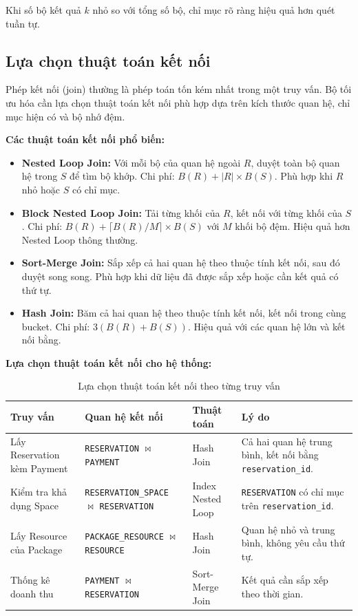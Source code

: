 Khi số bộ kết quả $k$ nhỏ so với tổng số bộ, chỉ mục rõ ràng hiệu quả hơn quét tuần tự.

\subsection{Lựa chọn thuật toán kết nối}

Phép kết nối (join) thường là phép toán tốn kém nhất trong một truy vấn. Bộ tối ưu hóa cần lựa chọn thuật toán kết nối phù hợp dựa trên kích thước quan hệ, chỉ mục hiện có và bộ nhớ đệm.

\textbf{Các thuật toán kết nối phổ biến:}

\begin{itemize}
    \item \textbf{Nested Loop Join:} Với mỗi bộ của quan hệ ngoài $R$, duyệt toàn bộ quan hệ trong $S$ để tìm bộ khớp. Chi phí: $B(R) + |R| \times B(S)$. Phù hợp khi $R$ nhỏ hoặc $S$ có chỉ mục.
    \item \textbf{Block Nested Loop Join:} Tải từng khối của $R$, kết nối với từng khối của $S$. Chi phí: $B(R) + \lceil B(R)/M \rceil \times B(S)$ với $M$ khối bộ đệm. Hiệu quả hơn Nested Loop thông thường.
    \item \textbf{Sort-Merge Join:} Sắp xếp cả hai quan hệ theo thuộc tính kết nối, sau đó duyệt song song. Phù hợp khi dữ liệu đã được sắp xếp hoặc cần kết quả có thứ tự.
    \item \textbf{Hash Join:} Băm cả hai quan hệ theo thuộc tính kết nối, kết nối trong cùng bucket. Chi phí: $3(B(R) + B(S))$. Hiệu quả với các quan hệ lớn và kết nối bằng.
\end{itemize}

\textbf{Lựa chọn thuật toán kết nối cho hệ thống:}

\begin{table}[htbp]
\centering
\begin{tabularx}{\linewidth}{|p{3.0cm}|p{4.2cm}|p{2.8cm}|X|}
\hline
\textbf{Truy vấn} & \textbf{Quan hệ kết nối} & \textbf{Thuật toán} & \textbf{Lý do} \\
\hline
Lấy Reservation kèm Payment & \texttt{RESERVATION} $\bowtie$ \texttt{PAYMENT} & Hash Join & Cả hai quan hệ trung bình, kết nối bằng \texttt{reservation\_id}. \\
\hline
Kiểm tra khả dụng Space & \texttt{RESERVATION\_SPACE} $\bowtie$ \texttt{RESERVATION} & Index Nested Loop & \texttt{RESERVATION} có chỉ mục trên \texttt{reservation\_id}. \\
\hline
Lấy Resource của Package & \texttt{PACKAGE\_RESOURCE} $\bowtie$ \texttt{RESOURCE} & Hash Join & Quan hệ nhỏ và trung bình, không yêu cầu thứ tự. \\
\hline
Thống kê doanh thu & \texttt{PAYMENT} $\bowtie$ \texttt{RESERVATION} & Sort-Merge Join & Kết quả cần sắp xếp theo thời gian. \\
\hline
\end{tabularx}
\caption{Lựa chọn thuật toán kết nối theo từng truy vấn}
\end{table}

